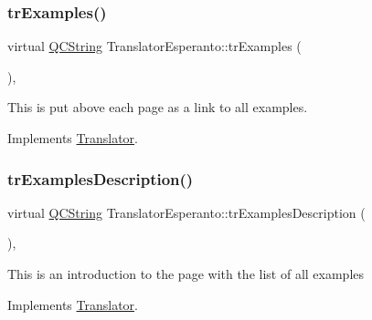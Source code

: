 \mbox{\label{class_translator_esperanto_a513d25a076a168b30900b4b570f6d427}} 
\subsubsection{\texorpdfstring{trExamples()}{trExamples()}}
{\footnotesize\ttfamily virtual \mbox{\hyperlink{class_q_c_string}{Q\+C\+String}} Translator\+Esperanto\+::tr\+Examples (\begin{DoxyParamCaption}{ }\end{DoxyParamCaption})\hspace{0.3cm}{\ttfamily [inline]}, {\ttfamily [virtual]}}

This is put above each page as a link to all examples. 

Implements \mbox{\hyperlink{class_translator}{Translator}}.

\mbox{\label{class_translator_esperanto_ac008de4220cb69145992cdf4018ea647}} 
\subsubsection{\texorpdfstring{trExamplesDescription()}{trExamplesDescription()}}
{\footnotesize\ttfamily virtual \mbox{\hyperlink{class_q_c_string}{Q\+C\+String}} Translator\+Esperanto\+::tr\+Examples\+Description (\begin{DoxyParamCaption}{ }\end{DoxyParamCaption})\hspace{0.3cm}{\ttfamily [inline]}, {\ttfamily [virtual]}}

This is an introduction to the page with the list of all examples 

Implements \mbox{\hyperlink{class_translator}{Translator}}.

\mbox{\label{class_translator_esperanto_a8cf8110f205bb7439a509230eff8e410}} 
